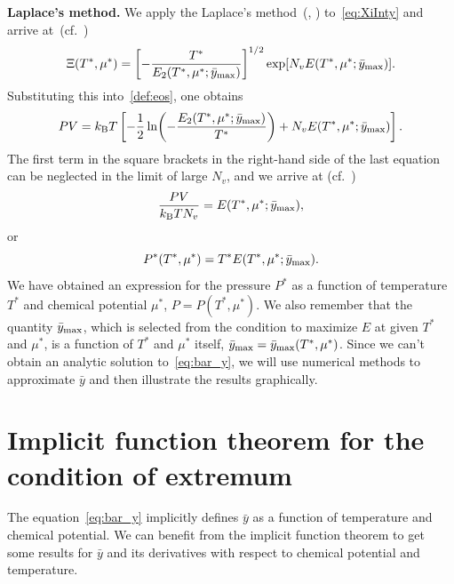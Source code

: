 \documentclass[12pt]{article}
\numberwithin{equation}{section}
\begin{document}
	\textbf{Laplace's method.} We apply the Laplace's method~(\cite[(1.21)]{Fedoryuk89}, \cite[(6.4.19c)]{BenderOrszag99}) to~\eqref{eq:XiInty} and arrive at~(cf.~\cite[(19)]{KD22})
	\begin{equation}
		\label{laplace1}
		\Xi(T^*,\mu^*) = \left[-\frac{T^*}{E_2(T^*,\mu^*;\bar{y}_{\rm max})}\right]^{1/2} \exp[N_v E(T^*,\mu^*;\bar{y}_{\rm max})].
	\end{equation}
	Substituting this into~\eqref{def:eos}, one obtains
	\begin{equation}
		P V = k_{\rm B}T \left[-\frac{1}{2} \ln(-\frac{E_2(T^*,\mu^*;\bar{y}_{\rm max})}{T^*}) + N_v E(T^*,\mu^*;\bar{y}_{\rm max})\right].
	\end{equation}
	The first term in the square brackets in the right-hand side of the last equation can be neglected in the limit of large $N_v$, and we arrive at (cf.~\cite[(2.27)]{KKD20})
	\begin{equation}
		\frac{P V}{k_{\rm B}T N_v} = E(T^*,\mu^*;\bar{y}_{\rm max}),
	\end{equation}
	or
	\begin{equation}
		\label{eos:reduced}
		P^*(T^*,\mu^*) = T^* E(T^*,\mu^*;\bar{y}_{\rm max}).
	\end{equation}
	We have obtained an expression for the pressure $P^*$ as a function of temperature $T^*$ and chemical potential $\mu^*$, $P = P(T^*, \mu^*)$. We also remember that the quantity $\bar{y}_{\rm max}$, which is selected from the condition to maximize $E$ at given $T^*$ and $\mu^*$, is a function of $T^*$ and $\mu^*$ itself, $\bar{y}_{\rm max} = \bar{y}_{\rm max}(T^*,\mu^*)$. Since we can't obtain an analytic solution to~\eqref{eq:bar_y}, we will use numerical methods to approximate $\bar{y}$ and then illustrate the results graphically.

	
	\pagebreak
	\section{Implicit function theorem for the condition of extremum}
	The equation~\eqref{eq:bar_y} implicitly defines $\bar{y}$ as a function of temperature and chemical potential. We can benefit from the implicit function theorem to get some results for $\bar{y}$ and its derivatives with respect to chemical potential and temperature.
	
\end{document}
